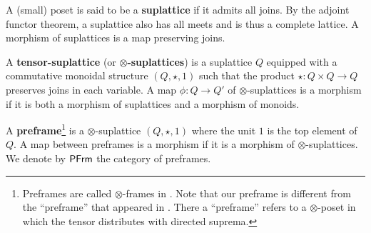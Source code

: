 \documentclass[10pt,a4paper,oneside]{article}
\begin{document}
\begin{de}
A (small) poset is said to be a \textbf{suplattice} if it admits all joins. By the adjoint functor theorem, a suplattice also has all meets and is thus a complete lattice. A morphism of suplattices is a map preserving joins.
\end{de}

\begin{de}
A \textbf{tensor-suplattice} (or \textbf{$\otimes$-suplattices}) is a suplattice $Q$ equipped with a commutative monoidal structure $(Q, \star, 1)$ such that the product $\star \colon Q \times Q \to Q$ preserves joins in each variable. A map $\phi \colon Q \to Q'$ of $\otimes$-suplattices is a morphism if it is both a morphism of suplattices and a morphism of monoids.
\end{de}

\begin{de}\label{de:preframe}
A \textbf{preframe}\footnote{Preframes are called $\otimes$-frames in \cite{anel2023left}. Note that our preframe is different from the ``preframe'' that appeared in \cite[Definition 3.3]{aoki2023sheaves}. There a ``preframe'' refers to a $\otimes$-poset in which the tensor distributes with directed suprema.} is a $\otimes$-suplattice $(Q, \star, 1)$ where the unit $1$ is the top element of $Q$. A map between preframes is a morphism if it is a morphism of $\otimes$-suplattices. We denote by $\mathsf{PFrm}$ the category of preframes.
\end{de}
\end{document}
